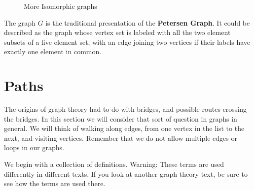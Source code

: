\begin{exmp}
\begin{figure}
{%
        } %
    \caption{More Isomorphic graphs}\label{fig:more iso graphs}
 \end{figure}
\end{exmp}
The graph $G$ is the traditional presentation of the {\bfseries {Petersen Graph}}.
It could be described as the graph whose vertex set is labeled with  all the two element subsets of a five element set, with an edge
joining two vertices if their labels have exactly one element in common. 

\section{Paths}\label{sect:paths}

The origins of graph theory had to do with bridges, and possible routes crossing the bridges. In this section we will consider that sort of question in graphs in general. We will think of walking along edges, from one vertex in the list to the next, and visiting vertices. Remember that we do not allow multiple edges or loops in our graphs. 

We begin with a collection of definitions. Warning: These terms are used differently in different texts. If you look at another graph theory text, be sure to see how the terms are used there.

